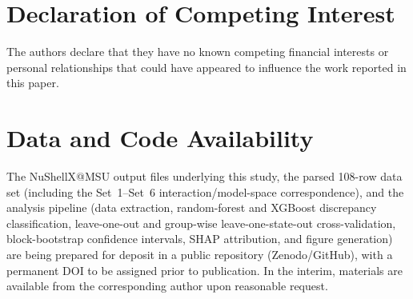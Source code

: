 \documentclass[10pt,twocolumn]{article}
\begin{document}
\section*{Declaration of Competing Interest}
The authors declare that they have no known competing financial interests or personal relationships that could have appeared to influence the work reported in this paper.

\section*{Data and Code Availability}
\label{sec:data-availability}
The NuShellX@MSU output files underlying this study, the parsed 108-row data set (including the Set~1--Set~6 interaction/model-space correspondence), and the analysis pipeline (data extraction, random-forest and XGBoost discrepancy classification, leave-one-out and group-wise leave-one-state-out cross-validation, block-bootstrap confidence intervals, SHAP attribution, and figure generation) are being prepared for deposit in a public repository (Zenodo/GitHub), with a permanent DOI to be assigned prior to publication. In the interim, materials are available from the corresponding author upon reasonable request.



\end{document}
